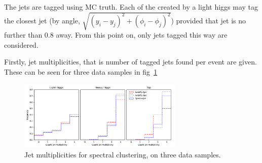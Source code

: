 The jets are tagged using MC truth.
Each of the  created by a light higgs may tag the closest jet (by angle, \(\sqrt{(y_i - y_j)^2 + (\phi_i - \phi_j)^2}\)) provided that jet is no further than \(0.8\) away.
From this point on, only jets tagged this way are considered.


Firstly, jet multiplicities, that is number of tagged jets found per event are given.
These can be seen for three data samples in fig~\ref{fig:multiplicity}


\begin{figure}[htp]
    \begin{center}
        \includegraphics[width=0.7\textwidth]{graphics/multiplicity/all3.png}
    \end{center}
    \caption{Jet multiplicities for spectral clustering, on three data samples.
    }\label{fig:multiplicity}
\end{figure}    



%


